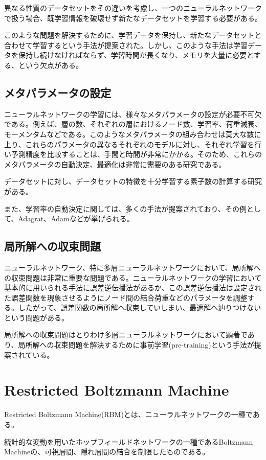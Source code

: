 異なる性質のデータセットをその違いを考慮し、一つのニューラルネットワークで扱う場合、既学習情報を破壊せず新たなデータセットを学習する必要がある。

このような問題を解決するために、学習データを保持し、新たなデータセットと合わせて学習するという手法が提案された。しかし、このような手法は学習データを保持し続けなければならず、学習時間が長くなり、メモリを大量に必要とする、という欠点がある。

\subsection{メタパラメータの設定}
ニューラルネットワークの学習には、様々なメタパラメータの設定が必要不可欠である。例えば、層の数、それぞれの層におけるノード数、学習率、荷重減衰、モーメンタムなどである。このようなメタパラメータの組み合わせは莫大な数に上り、これらのパラメータの異なるそれぞれのモデルに対し、それぞれ学習を行い予測精度を比較することは、手間と時間が非常にかかる。そのため、これらのメタパラメータの自動決定、最適化は非常に需要のある研究である。

データセットに対し、データセットの特徴を十分学習する素子数の計算する研究がある。

また、学習率の自動決定に関しては、多くの手法が提案されており、その例として、Adagrat、Adamなどが挙げられる。

\subsection{局所解への収束問題}
ニューラルネットワーク、特に多層ニューラルネットワークにおいて、局所解への収束問題は非常に重要な問題である。ニューラルネットワークの学習において基本的に用いられる手法に誤差逆伝播法があるか、この誤差逆伝播法は設定された誤差関数を現象させるようにノード間の結合荷重などのパラメータを調整する。したがって、誤差関数の局所解へ収束していしまい、最適解へ辿りつけないという問題がある。

局所解への収束問題はとりわけ多層ニューラルネットワークにおいて顕著であり、局所解への収束問題を解決するために事前学習(pre-training)という手法が提案されている。


\section{Restricted Boltzmann Machine}
Restricted Boltzmann Machine(RBM)とは、ニューラルネットワークの一種である。

統計的な変動を用いたホップフィールドネットワークの一種であるBoltzmann Machineの、可視層間、隠れ層間の結合を制限したものである。

